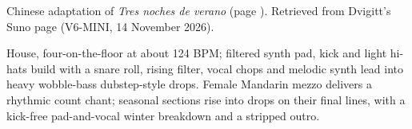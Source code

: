
\begin{notes}
Chinese adaptation of \emph{Tres noches de verano} (page \pageref{sec:tres-noches-de-verano}). Retrieved from Dvigitt's Suno page (V6-MINI, 14 November 2026).
\end{notes}
\begin{style}
House, four-on-the-floor at about 124 BPM; filtered synth pad, kick and light hi-hats build with a snare roll, rising filter, vocal chops and melodic synth lead into heavy wobble-bass dubstep-style drops. Female Mandarin mezzo delivers a rhythmic count chant; seasonal sections rise into drops on their final lines, with a kick-free pad-and-vocal winter breakdown and a stripped outro.
\end{style}
